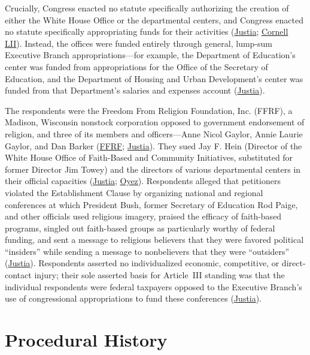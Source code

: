 \documentclass[12pt]{article}
\begin{document}
Crucially, Congress enacted no statute specifically authorizing the creation of either the White House Office or the departmental centers, and Congress enacted no statute specifically appropriating funds for their activities (\href{https://supreme.justia.com/cases/federal/us/551/587/}{Justia}; \href{https://www.law.cornell.edu/supct/html/06-157.ZS.html}{Cornell LII}). Instead, the offices were funded entirely through general, lump-sum Executive Branch appropriations---for example, the Department of Education's center was funded from appropriations for the Office of the Secretary of Education, and the Department of Housing and Urban Development's center was funded from that Department's salaries and expenses account (\href{https://supreme.justia.com/cases/federal/us/551/587/}{Justia}).

The respondents were the Freedom From Religion Foundation, Inc. (FFRF), a Madison, Wisconsin nonstock corporation opposed to government endorsement of religion, and three of its members and officers---Anne Nicol Gaylor, Annie Laurie Gaylor, and Dan Barker (\href{https://ffrf.org/news/releases/7thcwin/}{FFRF}; \href{https://supreme.justia.com/cases/federal/us/551/587/}{Justia}). They sued Jay F. Hein (Director of the White House Office of Faith-Based and Community Initiatives, substituted for former Director Jim Towey) and the directors of various departmental centers in their official capacities (\href{https://supreme.justia.com/cases/federal/us/551/587/}{Justia}; \href{https://www.oyez.org/cases/2006/06-157}{Oyez}). Respondents alleged that petitioners violated the Establishment Clause by organizing national and regional conferences at which President Bush, former Secretary of Education Rod Paige, and other officials used religious imagery, praised the efficacy of faith-based programs, singled out faith-based groups as particularly worthy of federal funding, and sent a message to religious believers that they were favored political ``insiders'' while sending a message to nonbelievers that they were ``outsiders'' (\href{https://supreme.justia.com/cases/federal/us/551/587/}{Justia}). Respondents asserted no individualized economic, competitive, or direct-contact injury; their sole asserted basis for Article~III standing was that the individual respondents were federal taxpayers opposed to the Executive Branch's use of congressional appropriations to fund these conferences (\href{https://supreme.justia.com/cases/federal/us/551/587/}{Justia}).

\section{Procedural History}
\end{document}
